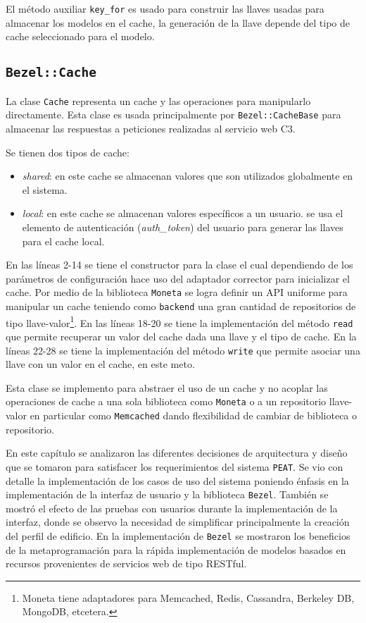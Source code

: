 El método auxiliar \texttt{key\_for} es usado para construir las llaves usadas para
almacenar los modelos en el cache, la generación de la llave depende del tipo de
cache seleccionado para el modelo.

\subsection{\texttt{Bezel::Cache}}

La clase \texttt{Cache} representa un cache y las operaciones para manipularlo
directamente. Esta clase es usada principalmente por \texttt{Bezel::CacheBase}
para almacenar las respuestas a peticiones realizadas al servicio web C3.

Se tienen dos tipos de cache:
\begin{itemize}
\item \textit{shared}: en este cache se almacenan valores que son utilizados
  globalmente en el sistema.
\item \textit{local}: en este cache se almacenan valores específicos a un usuario.
  se usa el elemento de autenticación (\textit{auth\_token}) del usuario para
  generar las llaves para el cache local.
\end{itemize}



En las líneas 2-14 se tiene el constructor para la clase el cual dependiendo de
los parámetros de configuración hace uso del adaptador corrector para inicializar
el cache. Por medio de la biblioteca \texttt{Moneta} se logra definir un API uniforme
para manipular un cache teniendo como \texttt{backend} una gran cantidad de
repositorios de tipo llave-valor\footnote{Moneta tiene adaptadores para Memcached,
  Redis, Cassandra, Berkeley DB, MongoDB, etcetera.}.
En las líneas 18-20 se tiene la implementación del método \texttt{read} que permite
recuperar un valor del cache dada una llave y el tipo de cache.
En la líneas 22-28 se tiene la implementación del método \texttt{write} que permite
asociar una llave con un valor en el cache, en este meto.

Esta clase se implemento para abstraer el uso de un cache y no acoplar las
operaciones de cache a una sola biblioteca como \texttt{Moneta} o a un
repositorio llave-valor en particular como \texttt{Memcached} dando flexibilidad de
cambiar de biblioteca o repositorio.

En este capítulo se analizaron las diferentes decisiones de arquitectura y diseño que
se tomaron para satisfacer los requerimientos del sistema \texttt{PEAT}.
Se vio con detalle la implementación de los casos de uso del sistema poniendo énfasis
en la implementación de la interfaz de usuario y la biblioteca \texttt{Bezel}.
También se mostró el efecto de las pruebas con usuarios durante la implementación de
la interfaz, donde se observo la necesidad de simplificar principalmente la creación
del perfil de edificio.
En la implementación de \texttt{Bezel} se mostraron los beneficios de la
metaprogramación para la rápida implementación de modelos basados
en recursos provenientes de servicios web de tipo RESTful.
